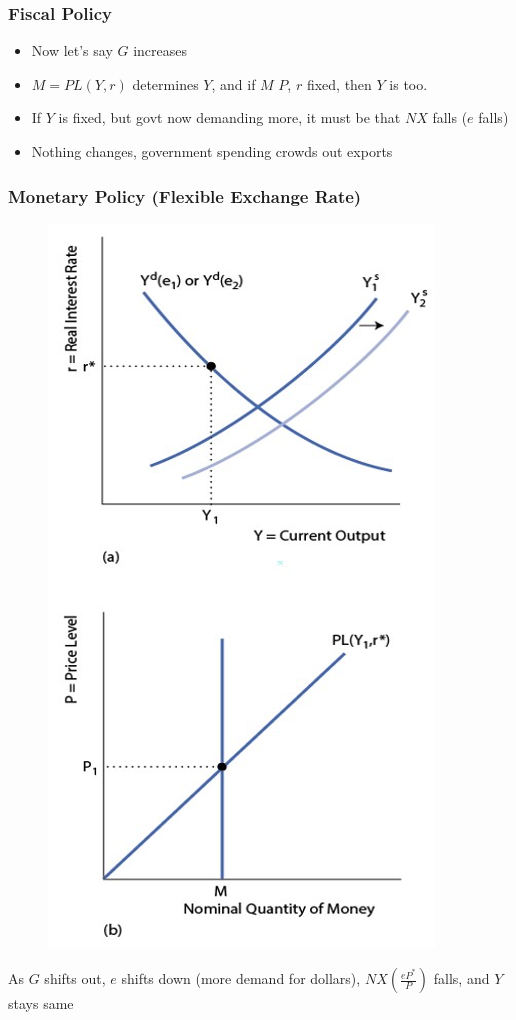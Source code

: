 \documentclass{beamer}
\begin{document}
\begin{frame}
\frametitle[alignment=center]{Fiscal Policy}
\begin{itemize}
\item Now let's say $G$ increases
\bigskip
\item $M=PL(Y,r)$ determines $Y$, and if $M$ $P$, $r$ fixed, then $Y$ is too.
\bigskip
\item If $Y$ is fixed, but govt now demanding more, it must be that $NX$ falls ($e$ falls)
\bigskip
\item Nothing changes, government spending crowds out exports
\end{itemize}
\end{frame}

\begin{frame}
\frametitle[alignment=center]{Monetary Policy (Flexible Exchange Rate)}
\begin{figure}
\centering
\includegraphics[scale=0.55]{Figures/W_Fig_17pt15.png}
\end{figure}
As $G$ shifts out, $e$ shifts down (more demand for dollars), $NX\left(\frac{eP^*}{P}\right)$ falls, and $Y$ stays same
\end{frame}
\end{document}

